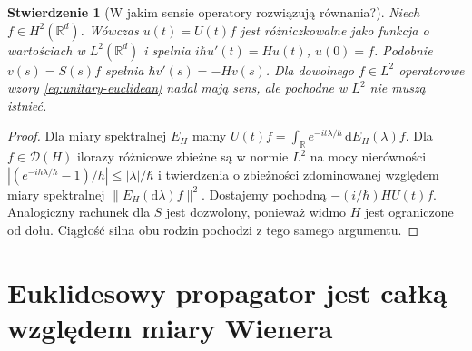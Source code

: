 \documentclass[11pt,a4paper,oneside]{report}
\numberwithin{equation}{chapter}
\theoremstyle{plain}
\newtheorem{stwierdzenie}[twierdzenie]{Stwierdzenie}
\theoremstyle{definition}
\theoremstyle{remark}
\newcommand{\R}{\mathbb{R}}
\newcommand{\dd}{\mathrm{d}}
\begin{document}
\begin{stwierdzenie}[W jakim sensie operatory rozwiązują równania?]\label{prop:volIII:16:01}
\label{prop:unitary-generator}
Niech $f\in H^2(\R^d)$. Wówczas $u(t)=U(t)f$ jest
różniczkowalne jako funkcja o wartościach w $L^2(\R^d)$
i spełnia $i\hbar u'(t)=Hu(t)$, $u(0)=f$.
Podobnie $v(s)=S(s)f$ spełnia $\hbar v'(s)=-Hv(s)$.
Dla dowolnego $f\in L^2$ operatorowe wzory
\eqref{eq:unitary-euclidean} nadal mają sens, ale
pochodne w $L^2$ nie muszą istnieć.
\end{stwierdzenie}
\begin{proof}
Dla miary spektralnej $E_H$ mamy
$U(t)f=\int_{\R}e^{-it\lambda/\hbar}\,\dd E_H(\lambda)f$.
Dla $f\in\mathcal D(H)$ ilorazy różnicowe zbieżne są
w normie $L^2$ na mocy nierówności
$|(e^{-ih\lambda/\hbar}-1)/h|\le|\lambda|/\hbar$
i twierdzenia o zbieżności zdominowanej względem
miary spektralnej $\|E_H(\dd\lambda)f\|^2$.
Dostajemy pochodną $-(i/\hbar)HU(t)f$.
Analogiczny rachunek dla $S$ jest dozwolony, ponieważ
widmo $H$ jest ograniczone od dołu. Ciągłość silna
obu rodzin pochodzi z tego samego argumentu.
\end{proof}

\section{Euklidesowy propagator jest całką względem miary Wienera}\label{sec:volIII:16:02}
\end{document}
